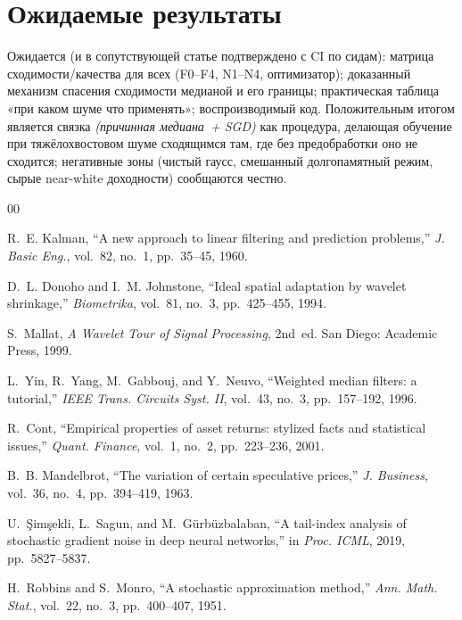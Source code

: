 \documentclass[conference]{IEEEtran}
\begin{document}
\section{Ожидаемые результаты}

Ожидается (и в сопутствующей статье подтверждено с CI по сидам):
матрица сходимости/качества для всех (F0--F4, N1--N4, оптимизатор);
доказанный механизм спасения сходимости медианой и его границы;
практическая таблица «при каком шуме что применять»; воспроизводимый
код. Положительным итогом является связка \emph{(причинная медиана~+
SGD)} как процедура, делающая обучение при тяжёлохвостовом шуме
сходящимся там, где без предобработки оно не сходится; негативные
зоны (чистый гаусс, смешанный долгопамятный режим, сырые near-white
доходности) сообщаются честно.

\begin{thebibliography}{00}

R.~E. Kalman, ``A new approach to linear filtering and prediction
problems,'' \textit{J. Basic Eng.}, vol.~82, no.~1, pp.~35--45, 1960.

D.~L. Donoho and I.~M. Johnstone, ``Ideal spatial adaptation by wavelet
shrinkage,'' \textit{Biometrika}, vol.~81, no.~3, pp.~425--455, 1994.

S.~Mallat, \textit{A Wavelet Tour of Signal Processing}, 2nd~ed. San
Diego: Academic Press, 1999.

L.~Yin, R.~Yang, M.~Gabbouj, and Y.~Neuvo, ``Weighted median filters: a
tutorial,'' \textit{IEEE Trans. Circuits Syst. II}, vol.~43, no.~3,
pp.~157--192, 1996.

R.~Cont, ``Empirical properties of asset returns: stylized facts and
statistical issues,'' \textit{Quant. Finance}, vol.~1, no.~2,
pp.~223--236, 2001.

B.~B. Mandelbrot, ``The variation of certain speculative prices,''
\textit{J. Business}, vol.~36, no.~4, pp.~394--419, 1963.

U.~\c{S}im\c{s}ekli, L.~Sagun, and M.~G\"{u}rb\"{u}zbalaban, ``A
tail-index analysis of stochastic gradient noise in deep neural
networks,'' in \textit{Proc. ICML}, 2019, pp.~5827--5837.

H.~Robbins and S.~Monro, ``A stochastic approximation method,''
\textit{Ann. Math. Stat.}, vol.~22, no.~3, pp.~400--407, 1951.


\end{thebibliography}
\end{document}
